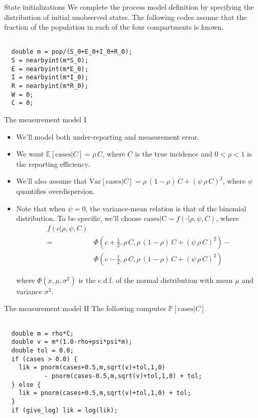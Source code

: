 \begin{frame}[fragile]{State initializations}
  We complete the process model definition by specifying the distribution of initial unobserved states.
  The following codes assume that the fraction of the population in each of the four compartments is known.
  
  \begin{lstlisting}[basicstyle=\ttfamily\scriptsize]

  double m = pop/(S_0+E_0+I_0+R_0);
  S = nearbyint(m*S_0);
  E = nearbyint(m*E_0);
  I = nearbyint(m*I_0);
  R = nearbyint(m*R_0);
  W = 0;
  C = 0;

  \end{lstlisting}
\end{frame}

\begin{frame}[fragile]{The measurement model I}
  \begin{itemize}
  \item We'll model both under-reporting and measurement error.
  \item We want $\mathbb{E}[\text{cases}|C] = \rho\,C$, where $C$ is the true incidence and $0<\rho<1$ is the reporting efficiency.
  \item We'll also assume that $\mathrm{Var}[\text{cases}|C] = \rho\,(1-\rho)\,C + (\psi\,\rho\,C)^2$, where $\psi$ quantifies overdispersion.
  \item Note that when $\psi=0$, the variance-mean relation is that of the binomial distribution.
    To be specific, we'll choose
    $\text{cases|C} \sim f(\cdot|\rho,\psi,C)$, where
    \begin{align*}
      f(c|\rho,\psi,C) \\
      =&\Phi(c+\tfrac{1}{2},\rho\,C,\rho\,(1-\rho)\,C+(\psi\,\rho\,C)^2)-\\
      &\Phi(c-\tfrac{1}{2},\rho\,C,\rho\,(1-\rho)\,C+(\psi\,\rho\,C)^2)
    \end{align*}

    where $\Phi(x,\mu,\sigma^2)$ is the c.d.f. of the normal distribution with mean $\mu$ and variance $\sigma^2$.
  \end{itemize}
\end{frame}

\begin{frame}[fragile]{The measurement model II}
  The following computes $\mathbb{P}[\text{cases}|C]$.
  
  \begin{lstlisting}[basicstyle=\ttfamily\scriptsize]

  double m = rho*C;
  double v = m*(1.0-rho+psi*psi*m);
  double tol = 0.0;
  if (cases > 0.0) {
    lik = pnorm(cases+0.5,m,sqrt(v)+tol,1,0)
           - pnorm(cases-0.5,m,sqrt(v)+tol,1,0) + tol;
  } else {
    lik = pnorm(cases+0.5,m,sqrt(v)+tol,1,0) + tol;
  }
  if (give_log) lik = log(lik);

  \end{lstlisting}
\end{frame}


